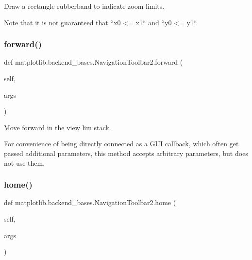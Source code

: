 \begin{DoxyVerb}Draw a rectangle rubberband to indicate zoom limits.

Note that it is not guaranteed that ``x0 <= x1`` and ``y0 <= y1``.
\end{DoxyVerb}
 \mbox{\label{classmatplotlib_1_1backend__bases_1_1NavigationToolbar2_a1c9984d95c94792ce6f7b8b301a68d4a}} 
\subsubsection{\texorpdfstring{forward()}{forward()}}
{\footnotesize\ttfamily def matplotlib.\+backend\+\_\+bases.\+Navigation\+Toolbar2.\+forward (\begin{DoxyParamCaption}\item[{}]{self,  }\item[{}]{args }\end{DoxyParamCaption})}

\begin{DoxyVerb}Move forward in the view lim stack.

For convenience of being directly connected as a GUI callback, which
often get passed additional parameters, this method accepts arbitrary
parameters, but does not use them.
\end{DoxyVerb}
 \mbox{\label{classmatplotlib_1_1backend__bases_1_1NavigationToolbar2_a842a8074e9720aea2681ff7204587013}} 
\subsubsection{\texorpdfstring{home()}{home()}}
{\footnotesize\ttfamily def matplotlib.\+backend\+\_\+bases.\+Navigation\+Toolbar2.\+home (\begin{DoxyParamCaption}\item[{}]{self,  }\item[{}]{args }\end{DoxyParamCaption})}

